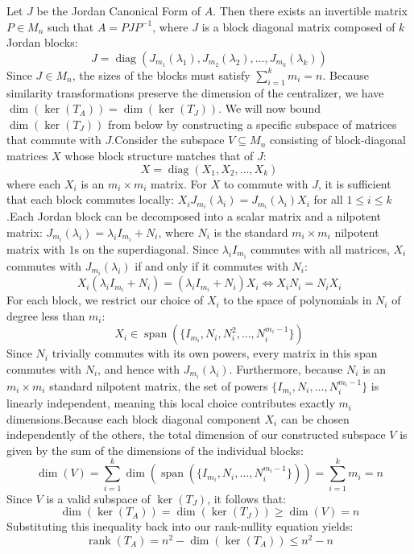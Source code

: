 \documentclass{article}
\begin{document}
	Let $J$ be the Jordan Canonical Form of $A$. Then there exists an invertible matrix $P \in M_n$ such that $A = PJP^{-1}$, where $J$ is a block diagonal matrix composed of $k$ Jordan blocks:$$J = \operatorname{diag}(J_{m_1}(\lambda_1), J_{m_2}(\lambda_2), \dots, J_{m_k}(\lambda_k))$$Since $J \in M_n$, the sizes of the blocks must satisfy $\sum_{i=1}^k m_i = n$. Because similarity transformations preserve the dimension of the centralizer, we have $\dim(\ker(T_A)) = \dim(\ker(T_J))$. We will now bound $\dim(\ker(T_J))$ from below by constructing a specific subspace of matrices that commute with $J$.Consider the subspace $V \subseteq M_n$ consisting of block-diagonal matrices $X$ whose block structure matches that of $J$:$$X = \operatorname{diag}(X_1, X_2, \dots, X_k)$$where each $X_i$ is an $m_i \times m_i$ matrix. For $X$ to commute with $J$, it is sufficient that each block commutes locally: $X_i J_{m_i}(\lambda_i) = J_{m_i}(\lambda_i) X_i$ for all $1 \leq i \leq k$.Each Jordan block can be decomposed into a scalar matrix and a nilpotent matrix: $J_{m_i}(\lambda_i) = \lambda_i I_{m_i} + N_i$, where $N_i$ is the standard $m_i \times m_i$ nilpotent matrix with $1$s on the superdiagonal. Since $\lambda_i I_{m_i}$ commutes with all matrices, $X_i$ commutes with $J_{m_i}(\lambda_i)$ if and only if it commutes with $N_i$:$$X_i(\lambda_i I_{m_i} + N_i) = (\lambda_i I_{m_i} + N_i)X_i \iff X_i N_i = N_i X_i$$For each block, we restrict our choice of $X_i$ to the space of polynomials in $N_i$ of degree less than $m_i$:$$X_i \in \operatorname{span}\left(\{I_{m_i}, N_i, N_i^2, \dots, N_i^{m_i-1}\}\right)$$Since $N_i$ trivially commutes with its own powers, every matrix in this span commutes with $N_i$, and hence with $J_{m_i}(\lambda_i)$. Furthermore, because $N_i$ is an $m_i \times m_i$ standard nilpotent matrix, the set of powers $\{I_{m_i}, N_i, \dots, N_i^{m_i-1}\}$ is linearly independent, meaning this local choice contributes exactly $m_i$ dimensions.Because each block diagonal component $X_i$ can be chosen independently of the others, the total dimension of our constructed subspace $V$ is given by the sum of the dimensions of the individual blocks:$$\dim(V) = \sum_{i=1}^k \dim\left(\operatorname{span}\left(\{I_{m_i}, N_i, \dots, N_i^{m_i-1}\}\right)\right) = \sum_{i=1}^k m_i = n$$Since $V$ is a valid subspace of $\ker(T_J)$, it follows that:$$\dim(\ker(T_A)) = \dim(\ker(T_J)) \geq \dim(V) = n$$Substituting this inequality back into our rank-nullity equation yields:$$\operatorname{rank}(T_A) = n^2 - \dim(\ker(T_A)) \leq n^2 - n$$
	
\end{document}
